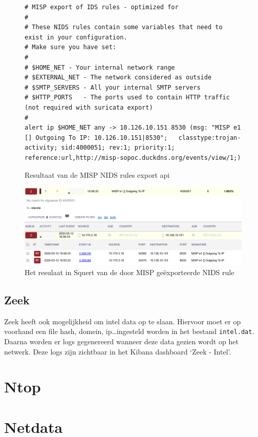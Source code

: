 \documentclass[a4paper,12pt]{report}
\begin{document}
\begin{figure}[H]
  \begin{lstlisting}
# MISP export of IDS rules - optimized for 
#
# These NIDS rules contain some variables that need to exist in your configuration.
# Make sure you have set:
#
# $HOME_NET - Your internal network range
# $EXTERNAL_NET - The network considered as outside
# $SMTP_SERVERS - All your internal SMTP servers
# $HTTP_PORTS   - The ports used to contain HTTP traffic (not required with suricata export)
# 
alert ip $HOME_NET any -> 10.126.10.151 8530 (msg: "MISP e1 [] Outgoing To IP: 10.126.10.151|8530";   classtype:trojan-activity; sid:4000051; rev:1; priority:1; reference:url,http://misp-sopoc.duckdns.org/events/view/1;)
  \end{lstlisting}
  \caption{Resultaat van de MISP NIDS rules export api}
  \label{fig:misp-export-txt}
\end{figure}

\begin{figure}[H]
  \centering
  \includegraphics[width=\textwidth]{misp-export-squert}
  \caption{Het resulaat in Squert van de door MISP geëxporteerde NIDS rule}
  \label{fig:misp-export-squert}
\end{figure}

\subsection{Zeek}
Zeek heeft ook mogelijkheid om intel data op te slaan.
Hiervoor moet er op voorhand een file hash, domein, ip\dots ingesteld worden in het bestand \lstinline|intel.dat|.
Daarna worden er logs gegenereerd wanneer deze data gezien wordt op het netwerk.
Deze logs zijn zichtbaar in het Kibana dashboard `Zeek - Intel'.

\section{Ntop}
\section{Netdata}
\end{document}
